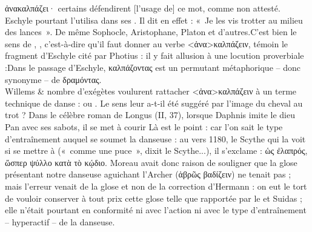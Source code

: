 {{ἀνακαλπάζει· certains défendirent [l'usage de] ce mot, comme non attesté. Eschyle pourtant l'utilisa dans ses . Il dit en effet : «~Je les vis trotter au milieu des lances~». De même Sophocle, Aristophane, Platon et d'autres.}C'est bien le sens de , , c'est-à-dire  qu'il faut donner au verbe <ἀνα>καλπάζειν, témoin le fragment d'Eschyle cité par Photius : il y fait allusion à une locution proverbiale :Dans le passage d'Eschyle, καλπάζοντας est un permutant métaphorique -- donc synonyme -- de δραμόντας.\\
Willems \& nombre d'exégètes voulurent rattacher <ἀνα>καλπάζειν à un terme technique de danse :  ou . Le sens leur a-t-il été suggéré par l'image du cheval au trot ? Dans le célèbre roman de Longus (II, 37), lorsque Daphnis imite le dieu Pan avec ses sabots, il se met à courir Là est le point : car l'on sait le type d'entraînement auquel se soumet la danseuse : au vers 1180, le Scythe qui la voit si  se mettre à  («~comme une puce~», dixit le Scythe...), il s'exclame : ὡς ἐλαπρός, ὥσπερ ψύλλο κατὰ τὸ κῴδιο.
Moreau avait donc raison de souligner que la glose présentant notre danseuse aguichant l'Archer  (ἁβρῶς βαδίζειν) ne tenait pas ; mais l'erreur venait de la glose et non de la correction d'Hermann : on eut le tort de vouloir conserver à tout prix cette glose telle que rapportée par le  et Suidas ; elle n'était pourtant en conformité ni avec l'action ni avec le type d'entraînement -- hyperactif -- de la danseuse.
}
